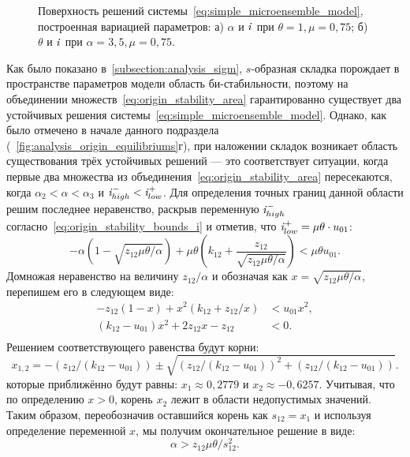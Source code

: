 \begin{figure}[t]
    \caption{Поверхность решений системы~\eqref{eq:simple_microensemble_model}, построенная вариацией параметров: а) $\alpha$ и $\mathit{i}$ при $\theta = 1, \mu = 0,75$; б) $\theta$ и $\mathit{i}$ при $\alpha = 3,5, \mu = 0,75$.}
    \label{fig:analysis_origin_solution_surface}
\end{figure}

Как было показано в~\autoref{subsection:analysis_sigm}, $s$-образная складка порождает в пространстве параметров модели область би-стабильности, поэтому на объединении множеств~\eqref{eq:origin_stability_area} гарантированно существует два устойчивых решения системы~\eqref{eq:simple_microensemble_model}. Однако, как было отмечено в начале данного подраздела (\seefigure~\ref{fig:analysis_origin_equilibriums}г), при наложении складок возникает область существования трёх устойчивых решений --- это соответствует ситуации, когда первые два множества из объединения~\eqref{eq:origin_stability_area} пересекаются, \ie когда $\alpha_{2} < \alpha < \alpha_{3}$ и $\mathit{i}_{high}^{-} < \mathit{i}_{low}^{+}$. Для определения точных границ данной области решим последнее неравенство, раскрыв переменную $\mathit{i}_{high}^{-}$ согласно~\eqref{eq:origin_stability_bounds_i} и отметив, что $\mathit{i}_{low}^{+} = \mu \theta \cdot u_{01}$:
\begin{equation}
    \nonumber
    -\alpha \left(1 - \sqrt{z_{12}\mu\theta/\alpha}\right) + \mu \theta \left(k_{12} + \dfrac{z_{12}}{\sqrt{z_{12}\mu\theta/\alpha}}\right) < \mu \theta u_{01}.
\end{equation}
Домножая неравенство на величину $z_{12} / \alpha$ и обозначая как $x = \sqrt{z_{12}\mu\theta/\alpha}$, перепишем его в следующем виде:
\begin{equation}
    \nonumber
    \begin{aligned}
        -z_{12} (1 - x) + x^{2} (k_{12} + z_{12} / x)   &< u_{01} x^{2}, \\
        (k_{12} - u_{01}) x^{2} + 2 z_{12} x - z_{12}   &< 0. \\
    \end{aligned}
\end{equation}
Решением соответствующего равенства будут корни:
\begin{equation}
    \nonumber
    x_{1,2} = -\left(z_{12} / (k_{12} - u_{01})\right) \pm \sqrt{\left(z_{12} / (k_{12} - u_{01})\right)^{2} + \left(z_{12} / (k_{12} - u_{01})\right)}.
\end{equation}
которые приближённо будут равны: $x_{1} \approx 0,2779$ и $x_{2} \approx -0,6257$. Учитывая, что по определению $x > 0$, корень $x_{2}$ лежит в области недопустимых значений. Таким образом, переобозначив оставшийся корень как $s_{12} = x_{1}$ и используя определение переменной $x$, мы получим окончательное решение в виде:
\begin{equation}
    \nonumber
    \alpha > z_{12} \mu \theta / s_{12}^{2}.
\end{equation}

